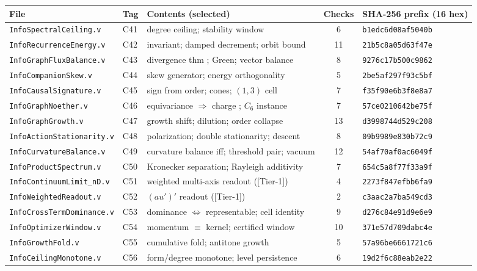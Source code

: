 \documentclass[10pt,twocolumn]{article}
\theoremstyle{definition}
\newcommand{\Tone}{\textsf{[Tier-1]}}
\newcommand{\code}[1]{\texttt{#1}}
\begin{document}
\begin{table}[t]
\centering\footnotesize
\begin{tabularx}{\textwidth}{@{}llYcl@{}}
\toprule
File & Tag & Contents (selected) & Checks & SHA-256 prefix (16 hex)\\
\midrule
\code{InfoSpectralCeiling.v} & C41 & degree ceiling; stability window & 6 & \code{b1edc6d08af5040b}\\
\code{InfoRecurrenceEnergy.v} & C42 & invariant; damped decrement; orbit bound & 11 & \code{21b5c8a05d63f47e}\\
\code{InfoGraphFluxBalance.v} & C43 & divergence thm \cite{green}; Green; vector balance & 8 & \code{9276c17b500c9862}\\
\code{InfoCompanionSkew.v} & C44 & skew generator; energy orthogonality & 5 & \code{2be5af297f93c5bf}\\
\code{InfoCausalSignature.v} & C45 & sign from order; cones; $(1,3)$ cell & 7 & \code{f35f90e6b3f8e8a7}\\
\code{InfoGraphNoether.v} & C46 & equivariance $\Rightarrow$ charge \cite{noether}; $C_6$ instance & 7 & \code{57ce0210642be75f}\\
\code{InfoGraphGrowth.v} & C47 & growth shift; dilution; order collapse & 13 & \code{d3998744d529c208}\\
\code{InfoActionStationarity.v} & C48 & polarization; double stationarity; descent & 8 & \code{09b9989e830b72c9}\\
\code{InfoCurvatureBalance.v} & C49 & curvature balance iff; threshold pair; vacuum & 12 & \code{54af70af0ac6049f}\\
\code{InfoProductSpectrum.v} & C50 & Kronecker separation; Rayleigh additivity & 7 & \code{654c5a8f77f33a9f}\\
\code{InfoContinuumLimit\_nD.v} & C51 & weighted multi-axis readout (\Tone{}) & 4 & \code{2273f847efbb6fa9}\\
\code{InfoWeightedReadout.v} & C52 & $(a u')'$ readout (\Tone{}) & 2 & \code{c3aac2a7ba549cd3}\\
\code{InfoCrossTermDominance.v} & C53 & dominance $\Leftrightarrow$ representable; cell identity & 9 & \code{d276c84e91d9e6e9}\\
\code{InfoOptimizerWindow.v} & C54 & momentum $\equiv$ kernel; certified window & 10 & \code{371e57d709dabc4e}\\
\code{InfoGrowthFold.v} & C55 & cumulative fold; antitone growth & 5 & \code{57a96be6661721c6}\\
\code{InfoCeilingMonotone.v} & C56 & form/degree monotone; level persistence & 6 & \code{19d2f6c88eab2e22}\\

\end{tabularx}
\end{table}
\end{document}
